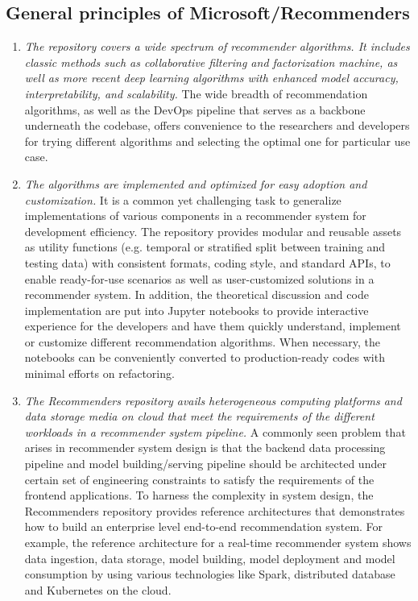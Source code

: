 \documentclass[twoside,11pt]{article}
\begin{document}
\subsection{General principles of Microsoft/Recommenders}
\begin{enumerate}
\item \emph{The repository covers a wide spectrum of recommender algorithms. It includes classic methods such as collaborative filtering and factorization machine, as well as more recent deep learning algorithms with enhanced model accuracy, interpretability, and scalability.} The wide breadth of recommendation algorithms, as well as the DevOps pipeline that serves as a backbone underneath the codebase, offers convenience to the researchers and developers for trying different algorithms and selecting the optimal one for particular use case. 
\item \emph{The algorithms are implemented and optimized for easy adoption and customization.} It is a common yet challenging task to generalize implementations of various components in a recommender system for development efficiency. The repository provides modular and reusable assets as utility functions (e.g. temporal or stratified split between training and testing data) with consistent formats, coding style, and standard APIs, to enable ready-for-use scenarios as well as user-customized solutions in a recommender system. In addition, the theoretical discussion and code implementation are put into Jupyter notebooks to provide interactive experience for the developers and have them quickly understand, implement or customize different recommendation algorithms. When necessary, the notebooks can be conveniently converted to production-ready codes with minimal efforts on refactoring. 
\item \emph{The Recommenders repository avails heterogeneous computing platforms and data storage media on cloud that meet the requirements of the different workloads in a recommender system pipeline.} A commonly seen problem that arises in recommender system design is that the backend data processing pipeline and model building/serving pipeline should be architected under certain set of engineering constraints to satisfy the requirements of the frontend applications. To harness the complexity in system design, the Recommenders repository provides reference architectures that demonstrates how to build an enterprise level end-to-end recommendation system. For example, the reference architecture for a real-time recommender system shows data ingestion, data storage, model building, model deployment and model consumption by using various technologies like Spark, distributed database and Kubernetes on the cloud. 

\end{enumerate}
\end{document}
